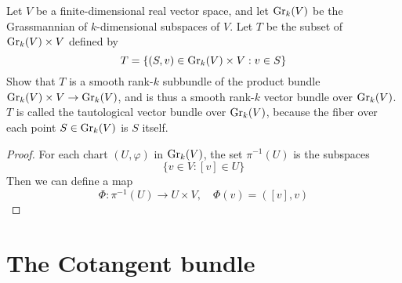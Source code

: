 \begin{exercise}
Let $V$ be a finite-dimensional real vector space, and let $\mathrm{Gr}_k(V)$ be the Grassmannian of $k$-dimensional subspaces of $V$. Let $T$ be the subset of $\mathrm{Gr}_k(V)\times V$ defined by
\[T=\{(S,v)\in\mathrm{Gr}_k(V)\times V:v\in S\}\]
Show that $T$ is a smooth rank-$k$ subbundle of the product bundle $\mathrm{Gr}_k(V)\times V\to\mathrm{Gr}_k(V)$, and is thus a smooth rank-$k$ vector bundle over $\mathrm{Gr}_k(V)$. $T$ is called the tautological vector bundle over $\mathrm{Gr}_k(V)$, because the fiber over each point $S\in\mathrm{Gr}_k(V)$ is $S$ itself.
\end{exercise}
\begin{proof}
For each chart $(U,\varphi)$ in $\mathrm{Gr}_k(V)$, the set $\pi^{-1}(U)$ is the subspaces 
\[\{v\in V:[v]\in U\}\]
Then we can define a map
\[\varPhi:\pi^{-1}(U)\to U\times V,\quad \varPhi(v)=([v],v)\]
\end{proof}
\section{The Cotangent bundle}\label{cotangent bundle section}
